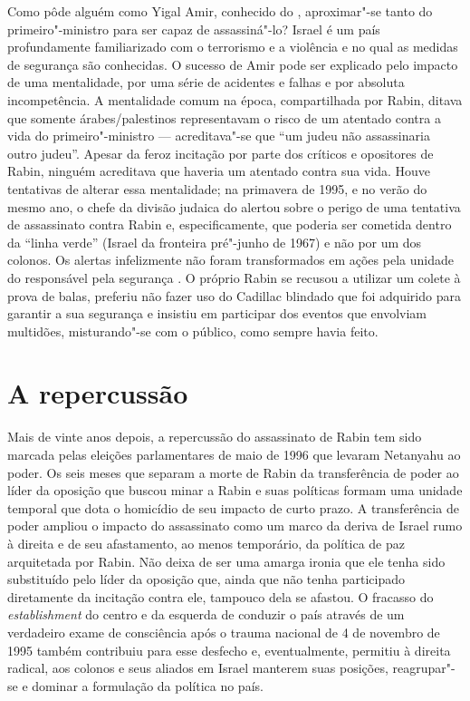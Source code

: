Como pôde alguém como Yigal Amir, conhecido do , aproximar"-se tanto
do primeiro"-ministro para ser capaz de assassiná"-lo? Israel é
um país profundamente familiarizado com o terrorismo e a violência e no
qual as medidas de segurança são conhecidas. O sucesso de Amir pode ser
explicado pelo impacto de uma mentalidade, por uma série de acidentes e
falhas e por absoluta incompetência. A mentalidade comum na época,
compartilhada por Rabin, ditava que somente árabes/palestinos
representavam o risco de um atentado contra a vida do primeiro"-ministro
--- acreditava"-se que ``um judeu não assassinaria outro judeu''. Apesar
da feroz incitação por parte dos críticos e opositores de Rabin, ninguém
acreditava que haveria um atentado contra sua vida. Houve tentativas de
alterar essa mentalidade; na primavera de 1995, e no verão do mesmo ano,
o chefe da divisão judaica do  alertou sobre o perigo de uma
tentativa de assassinato contra Rabin e, especificamente, que poderia
ser cometida dentro da ``linha verde'' (Israel da fronteira pré"-junho de
1967) e não por um dos colonos. Os alertas infelizmente não foram
transformados em ações pela unidade do  responsável pela segurança
. O próprio Rabin se recusou a utilizar um colete à prova de balas,
preferiu não fazer uso do Cadillac blindado que foi adquirido para
garantir a sua segurança e insistiu em participar dos eventos que
envolviam multidões, misturando"-se com o público, como sempre havia
feito.

\section{A repercussão}

Mais de vinte anos depois, a repercussão do assassinato de Rabin tem
sido marcada pelas eleições parlamentares de maio de 1996 que levaram
Netanyahu ao poder. Os seis meses que separam a morte de Rabin da
transferência de poder ao líder da oposição que buscou minar a Rabin e
suas políticas formam uma unidade temporal que dota o homicídio de
seu impacto de curto prazo. A transferência de poder ampliou o impacto
do assassinato como um marco da deriva de Israel rumo à direita e de seu
afastamento, ao menos temporário, da política de paz arquitetada por
Rabin. Não deixa de ser uma amarga ironia que ele tenha sido substituído
pelo líder da oposição que, ainda que não tenha participado diretamente
da incitação contra ele, tampouco dela se afastou. O fracasso do
\emph{establishment} do centro e da esquerda de conduzir o país através
de um verdadeiro exame de consciência após o trauma nacional de 4 de
novembro de 1995 também contribuiu para esse desfecho e, eventualmente,
permitiu à direita radical, aos colonos e seus aliados em Israel
manterem suas posições, reagrupar"-se e dominar a formulação da política
no país.

